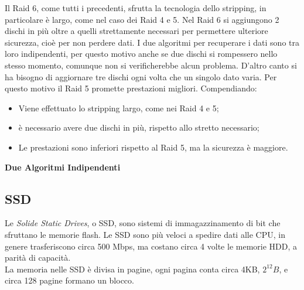 \documentclass{article}
\begin{document}
Il Raid 6, come tutti i precedenti, sfrutta la tecnologia dello stripping, in particolare è largo, come nel caso dei Raid 4 e 5. Nel Raid 6 si aggiungono 2 dischi in più oltre a quelli strettamente necessari per permettere ulteriore sicurezza, cioè per non perdere dati. I due algoritmi per recuperare i dati sono tra loro indipendenti, per questo motivo anche se due dischi si rompessero nello stesso momento, comunque non si verificherebbe alcun problema. D'altro canto si ha bisogno di aggiornare tre dischi ogni volta che un singolo dato varia. Per questo motivo il Raid 5 promette prestazioni migliori. Compendiando:
\begin{itemize}
	\item Viene effettuato lo stripping largo, come nei Raid 4 e 5;

	\item è necessario avere due dischi in più, rispetto allo stretto necessario;

	\item Le prestazioni sono inferiori rispetto al Raid 5, ma la sicurezza è maggiore.
\end{itemize}

\textbf{Due Algoritmi Indipendenti}

\subsection{SSD}

Le \textit{Solide Static Drives}, o SSD, sono sistemi di immagazzinamento di bit che sfruttano le memorie flash. Le SSD sono più veloci a spedire dati alle CPU, in genere trasferiscono circa 500 Mbps, ma costano circa 4 volte le memorie HDD, a parità di capacità. \\
La memoria nelle SSD è divisa in pagine, ogni pagina conta circa 4KB, $2^12 B$, e circa 128 pagine formano un blocco.\\
\end{document}
